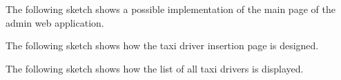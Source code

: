 The following sketch shows a possible implementation of the main page of the admin web application. 
\begin{figure}[H]
\centering
{}
\end{figure}
\pagebreak
The following sketch shows how the taxi driver insertion page is designed. 
\begin{figure}[H]
\centering
{}
\end{figure}

The following sketch shows how the list of all taxi drivers is displayed.
\begin{figure}[H]
\centering
{}
\end{figure}

